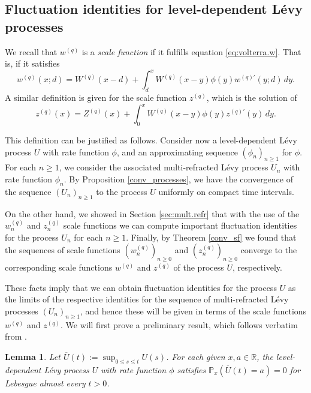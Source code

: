 \documentclass[12pt,reqno]{amsart}
\newtheorem{lemma}[theorem]{Lemma}
\theoremstyle{definition}
\theoremstyle{remark}
\begin{document}
	
\subsection{Fluctuation identities for level-dependent L\'evy processes}
We  recall  that $w^{(q)}$ is a {\it scale function} if it fulfills
equation \eqref{eq:volterra.w}. That is, if it satisfies
\begin{equation}
\label{sf_gd_1}
w^{(q)}(x;d)=W^{(q)}(x-d)+\int_d^xW^{(q)}(x-y)\phi(y)w^{(q)\prime}(y;d)\,dy.
\end{equation}
A similar definition is given for the scale function $z^{(q)}$, which is the solution
of 
\begin{equation}\label{sf_gd_2}
z^{(q)}(x)=Z^{(q)}(x)+\int_0^xW^{(q)}(x-y)\phi(y)z^{(q)\prime}(y)\,dy.
\end{equation}

This definition can be justified as follows.
Consider now a level-dependent L\'evy process $U$ with rate function $\phi$, and an approximating sequence $(\phi_n)_{n\geq1}$ for $\phi$. 
For each $n\geq 1$, we consider the associated multi-refracted L\'evy process $U_n$ with rate function $\phi_n$. 
By Proposition \ref{conv_processes}, we have the convergence of the sequence $(U_n)_{n\geq1}$ to the process $U$ uniformly on compact time intervals.

On the other hand, we showed in Section \ref{sec:mult.refr} that with the use of the $w^{(q)}_n$ and $z^{(q)}_n$ scale functions 
we can compute important fluctuation identities for the process $U_n$ for each $n\geq1$.
Finally, by Theorem \ref{conv_sf} we found that the sequences of scale functions $(w^{(q)}_n)_{n\geq0}$ and $(z^{(q)}_n)_{n\geq0}$ converge to the corresponding scale functions 
  $w^{(q)}$ and $z^{(q)}$ of the process $U$, respectively.

These facts imply that we can obtain fluctuation identities for the process $U$ as the limits of 
the respective identities for the sequence of multi-refracted L\'evy processes $(U_n)_{n\geq1}$, 
and hence these will be given in terms of the scale functions $w^{(q)}$ and $z^{(q)}$. We will first prove a preliminary result, which follows verbatim from
\cite{kyprianouloeffen2010}. 
\begin{lemma}\label{p=0}
Let $\overline{U}(t):=\sup_{0\leq s\leq t}U(s)$. For each given $x,a\in\mathbb{R}$, 
the level-dependent L\'evy process $U$ with rate function $\phi$ satisfies 
$\mathbb{P}_x(\overline{U}(t) = a) = 0$ for Lebesgue almost every $t>0$. 
\end{lemma}
\end{document}
